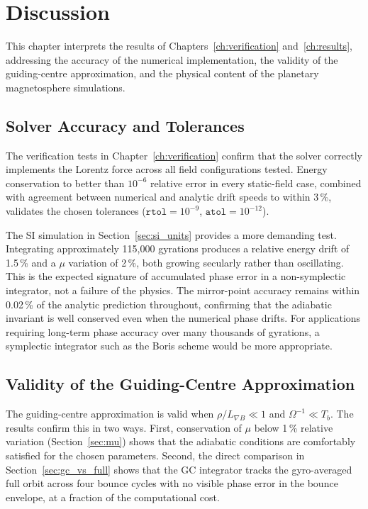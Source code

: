 \chapter{Discussion}
\label{ch:discussion}

This chapter interprets the results of Chapters~\ref{ch:verification} and~\ref{ch:results}, addressing the accuracy of the numerical implementation, the validity of the guiding-centre approximation, and the physical content of the planetary magnetosphere simulations.

\section{Solver Accuracy and Tolerances}
\label{sec:disc_validity}

The verification tests in Chapter~\ref{ch:verification} confirm that the solver correctly implements the Lorentz force across all field configurations tested. Energy conservation to better than $10^{-6}$ relative error in every static-field case, combined with agreement between numerical and analytic drift speeds to within 3\,\%, validates the chosen tolerances ($\texttt{rtol} = 10^{-9}$, $\texttt{atol} = 10^{-12}$).

The SI simulation in Section~\ref{sec:si_units} provides a more
demanding test. Integrating approximately 115{,}000 gyrations produces a relative energy drift of 1.5\,\% and a $\mu$ variation of 2\,\%, both growing secularly rather than oscillating. This is the expected signature of accumulated phase error in a non-symplectic integrator, not a failure of the physics. The mirror-point accuracy remains within 0.02\,\% of the analytic prediction throughout, confirming that the adiabatic invariant is well conserved even when the numerical phase drifts. For applications requiring long-term phase accuracy over many thousands of gyrations, a symplectic integrator such as the Boris scheme would be more appropriate.

\section{Validity of the Guiding-Centre Approximation}
\label{sec:disc_gc}

The guiding-centre approximation is valid when $\rho / L_{\nabla B} \ll 1$ and $\Omega^{-1} \ll T_b$. The results confirm this in two ways. First, conservation of $\mu$ below 1\,\% relative variation (Section~\ref{sec:mu}) shows that the adiabatic conditions are comfortably satisfied for the chosen parameters. Second, the direct comparison in Section~\ref{sec:gc_vs_full} shows that the GC integrator
tracks the gyro-averaged full orbit across four bounce cycles with no visible phase error in the bounce envelope, at a fraction of the computational cost.

